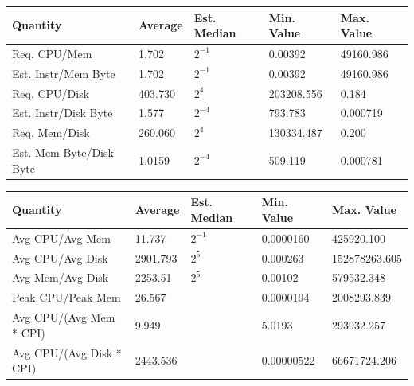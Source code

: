 \documentclass[a0,portrait]{a0poster}
\begin{document}
\begin{multicols}{2}
\begin{center}\vspace{1cm}
\begin{tabular}{| l | l l l l |} 
\toprule
\textbf{Quantity} & \textbf{Average} & \textbf{Est. Median} & \textbf{Min. Value} & \textbf{Max. Value} \\
\midrule
Req. CPU/Mem & 1.702 &  $2^{-1}$ & 0.00392 & 49160.986  \\ \hline
Est. Instr/Mem Byte & 1.702 & $2^{-1} $ & 0.00392 & 49160.986 \\ \hline
Req. CPU/Disk & 403.730 & $2^4$ & 203208.556 & 0.184 \\ \hline
Est. Instr/Disk Byte & 1.577 & $2^{-4}$ & 793.783 & 0.000719 \\ \hline
Req. Mem/Disk & 260.060 & $2^4$ & 130334.487 & 0.200 \\ \hline
Est. Mem Byte/Disk Byte & 1.0159&  $2^{-4}$ & 509.119 & 0.000781 \\ \hline
\bottomrule
\end{tabular}
\end{center}\vspace{1cm}

\begin{center}\vspace{1cm}
\begin{tabular}{| l | l l l l |} 
\toprule
\textbf{Quantity} & \textbf{Average} & \textbf{Est. Median} & \textbf{Min. Value} & \textbf{Max. Value} \\
\midrule
Avg CPU/Avg Mem & 11.737 & $2^{-1}$ & 0.0000160 & 425920.100  \\ 
Avg CPU/Avg Disk & 2901.793 & $2^5$ & 0.000263 & 152878263.605 \\ 
Avg Mem/Avg Disk & 2253.51 & $2^5$ & 0.00102 & 579532.348 \\ 
Peak CPU/Peak Mem & 26.567 & & 0.0000194 & 2008293.839 \\ 
Avg CPU/(Avg Mem * CPI) & 9.949 & & 5.0193 & 293932.257 \\ 
Avg CPU/(Avg Disk * CPI) & 2443.536 & & 0.00000522 & 66671724.206 \\ 
\bottomrule
\end{tabular}
\end{center}\vspace{1cm}


\end{multicols}
\end{document}
